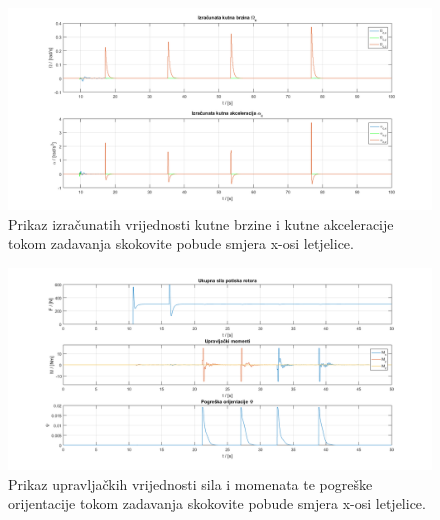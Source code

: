 \documentclass[times, utf8, diplomski]{fer}
\begin{document}
	\begin{figure}[!h]
		\includegraphics[width=\textwidth]{plots/b1d_alpha_omega.png}
		\caption{Prikaz izračunatih vrijednosti kutne brzine i kutne  akceleracije tokom zadavanja skokovite pobude smjera x-osi letjelice.}
	\end{figure}
	
	\newpage
	\clearpage
	
	\begin{figure}[h!]
		\includegraphics[width=\textwidth]{plots/pos_force_moments.png}
		\caption{Prikaz upravljačkih vrijednosti sila i momenata te pogreške orijentacije tokom zadavanja skokovite pobude smjera x-osi letjelice.}
	\end{figure}
	
\end{document}
